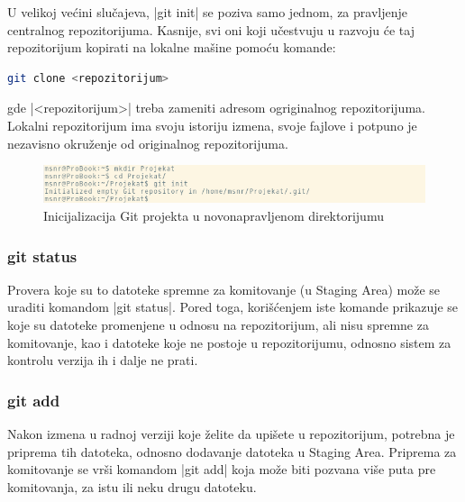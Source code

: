 \documentclass[a4paper]{article}
\begin{document}
{U velikoj većini slučajeva, |git init| se poziva samo jednom, za pravljenje centralnog repozitorijuma. Kasnije, svi oni koji učestvuju u razvoju će taj repozitorijum kopirati na lokalne mašine pomoću komande:
\begin{lstlisting}[language=bash]
git clone <repozitorijum>
\end{lstlisting}
\noindent
gde |<repozitorijum>| treba zameniti adresom ogriginalnog repozitorijuma. Lokalni repozitorijum ima svoju istoriju izmena, svoje fajlove i potpuno je nezavisno okruženje od originalnog repozitorijuma. 

\begin{figure}[h!]
\begin{center}
\includegraphics[scale=0.55]{images/init.png}
\end{center}
\caption{Inicijalizacija Git projekta u novonapravljenom direktorijumu}
\label{fig:git_init}
\end{figure}


\subsubsection*{git status}
\label{subsec:git_status}
Provera koje su to datoteke spremne za komitovanje (u Staging Area) može se uraditi komandom |git status|. Pored toga, korišćenjem iste komande prikazuje se koje su datoteke promenjene u odnosu na repozitorijum, ali nisu spremne za komitovanje, kao i datoteke koje ne postoje u repozitorijumu, odnosno sistem za kontrolu verzija ih i dalje ne prati.

\subsubsection*{git add}
\label{subsec:git_add}
Nakon izmena u radnoj verziji koje želite da upišete u repozitorijum, potrebna je priprema tih datoteka, odnosno dodavanje datoteka u Staging Area. Priprema za komitovanje se vrši komandom |git add| koja može biti pozvana više puta pre komitovanja, za istu ili neku drugu datoteku.


}
\end{document}
